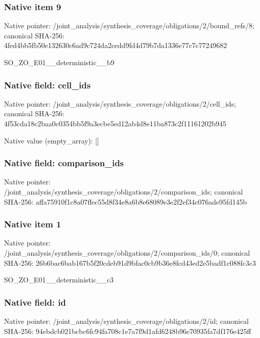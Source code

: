 \documentclass[10pt,a4paper]{article}
\begin{document}
\subsubsection{Native item 9}
Native pointer: /joint\_\allowbreak{}analysis/synthesis\_\allowbreak{}coverage/obligations/2/bound\_\allowbreak{}refs/8; canonical SHA-256: 4fed4bb5fb50e132630c6ad9c724da2cedd9fd4d79b7da1336e77c7c77249682

\begingroup\raggedright\sloppy SO\_\allowbreak{}ZO\_\allowbreak{}E01\_\allowbreak{}\_\allowbreak{}deterministic\_\allowbreak{}\_\allowbreak{}b9\par\endgroup

\subsubsection{Native field: cell\_\allowbreak{}ids}
Native pointer: /joint\_\allowbreak{}analysis/synthesis\_\allowbreak{}coverage/obligations/2/cell\_\allowbreak{}ids; canonical SHA-256: 4f53cda18c2baa0c0354bb5f9a3ecbe5ed12ab4d8e11ba873c2f11161202b945

Native value (empty\_\allowbreak{}array): []

\subsubsection{Native field: comparison\_\allowbreak{}ids}
Native pointer: /joint\_\allowbreak{}analysis/synthesis\_\allowbreak{}coverage/obligations/2/comparison\_\allowbreak{}ids; canonical SHA-256: affa75910f1c8a07ffec55d8f34e8a6b8e68089e3e2f2ef34c076ade95fd145b

\subsubsection{Native item 1}
Native pointer: /joint\_\allowbreak{}analysis/synthesis\_\allowbreak{}coverage/obligations/2/comparison\_\allowbreak{}ids/0; canonical SHA-256: 26b6bac6bab167b5f20cdeb91d9bfac0cb9b36e8fcd43ed2e5badf1c088fc3c3

\begingroup\raggedright\sloppy SO\_\allowbreak{}ZO\_\allowbreak{}E01\_\allowbreak{}\_\allowbreak{}deterministic\_\allowbreak{}\_\allowbreak{}c3\par\endgroup

\subsubsection{Native field: id}
Native pointer: /joint\_\allowbreak{}analysis/synthesis\_\allowbreak{}coverage/obligations/2/id; canonical SHA-256: 94ebdcb021bcbc6fc94fa708c1e7a7f9d1afd6248b96e70935fa7df176e425ff
\end{document}
